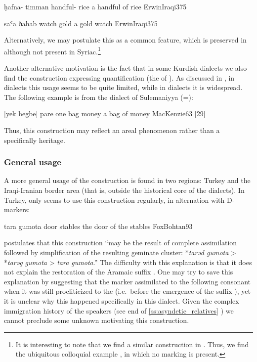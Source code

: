 {ḥafna- timman}
{handful- rice}
{a handful of rice}
{ErwinIraqi}{375}

{sāʿa ðahab}
{watch gold}
{a gold watch}
{ErwinIraqi}{375}


 Alternatively, we may postulate this as a common  feature, which is preserved in  although not present in Syriac.\footnote{It is interesting to note that we find a similar construction in \MHeb. Thus, we find the ubiquitous colloquial example , in which no \cst* marking is present.}

Another alternative motivation is the fact that in some Kurdish dialects we also find  the  construction expressing quantification (the  of \cite[63f.]{MacKenzie}). As discussed in , in \Kur dialects this usage seems to be quite limited, while in \Sor dialects it is widespread. The following example is from the dialect of Sulemaniyya (=):




{[yek hegbe] pare}
{one bag money}
{a bag of money}
{MacKenzie}{63 {[29]}}

Thus, this construction may reflect an areal phenomenon rather than a specifically  heritage. 

\subsubsection{General usage} \label{ss:Juxt_general_usage}






A more general usage of the  construction is found in two regions: Turkey and the Iraqi-Iranian border area (that is, outside the historical core of the  dialects). In Turkey, only \Boh seems to use this construction regularly, in alternation with D-markers:

{tara gumota}
{door stables}
{the door of the stables}
{FoxBohtan}{93}

\citet[92]{FoxBohtan} postulates that this construction \enquote{may be the result of complete assimilation followed by simplification of the resulting geminate cluster: *\textit{tarəd gumota} > *\textit{tarəg gumota} > \textit{tara gumota}.} The difficulty with this explanation is that it does not explain the restoration of the Aramaic \free* suffix . One may try to save this explanation by suggesting that the  marker assimilated to the following consonant when it was still procliticized to the \secn (i.e.\ before the emergence of the \cst* suffix \ed), yet it is unclear why this happened specifically in this dialect. Given the complex immigration history of the \Boh speakers (see end of \ref{ss:asyndetic_relatives} ) we cannot preclude some unknown  motivating this construction.

